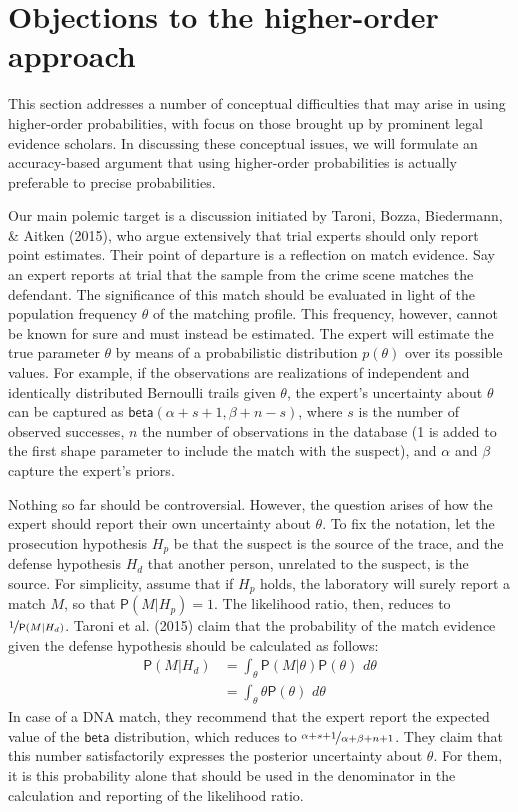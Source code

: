 \documentclass[
  10pt,
  dvipsnames,enabledeprecatedfontcommands]{scrartcl}
\newcommand{\pr}[1]{\mathsf{P}(#1)}
\newcommand{\s}[1]{\mbox{$\mathsf{#1}$}}
\begin{document}
\pagebreak

\hypertarget{objections-to-the-higher-order-approach}{%
\section{Objections to the higher-order
approach}\label{objections-to-the-higher-order-approach}}

This section addresses a number of conceptual difficulties that may
arise in using higher-order probabilities, with focus on those brought
up by prominent legal evidence scholars. In discussing these conceptual
issues, we will formulate an accuracy-based argument that using
higher-order probabilities is actually preferable to precise
probabilities.

Our main polemic target is a discussion initiated by Taroni, Bozza,
Biedermann, \& Aitken (2015), who argue extensively that trial experts
should only report point estimates. Their point of departure is a
reflection on match evidence. Say an expert reports at trial that the
sample from the crime scene matches the defendant. The significance of
this match should be evaluated in light of the population frequency
\(\theta\) of the matching profile. This frequency, however, cannot be
known for sure and must instead be estimated. The expert will estimate
the true parameter \(\theta\) by means of a probabilistic distribution
\(p(\theta)\) over its possible values. For example, if the observations
are realizations of independent and identically distributed Bernoulli
trails given \(\theta\), the expert's uncertainty about \(\theta\) can
be captured as \(\s{beta}(\alpha + s + 1 ,\beta + n - s)\), where \(s\)
is the number of observed successes, \(n\) the number of observations in
the database (1 is added to the first shape parameter to include the
match with the suspect), and \(\alpha\) and \(\beta\) capture the
expert's priors.

Nothing so far should be controversial. However, the question arises of
how the expert should report their own uncertainty about \(\theta\). To
fix the notation, let the prosecution hypothesis \(H_p\) be that the
suspect is the source of the trace, and the defense hypothesis \(H_d\)
that another person, unrelated to the suspect, is the source. For
simplicity, assume that if \(H_p\) holds, the laboratory will surely
report a match \(M\), so that \(\pr{M\vert H_p}=1\). The likelihood
ratio, then, reduces to \(\nicefrac{1}{\pr{M \vert H_d}}\). Taroni et
al. (2015) claim that the probability of the match evidence given the
defense hypothesis should be calculated as follows:
\begin{align*}\pr{M \vert H_d} & = \int_{\theta} \pr{M\vert \theta} \pr{\theta}\,\, d\theta \\
& =  \int_\theta  \theta \pr{\theta}\,\, d\theta
\end{align*} In case of a DNA match, they recommend that the expert
report the expected value of the \(\s{beta}\) distribution, which
reduces to \(\nicefrac{\alpha + s + 1}{\alpha + \beta +n + 1}\). They
claim that this number satisfactorily expresses the posterior
uncertainty about \(\theta\). For them, it is this probability alone
that should be used in the denominator in the calculation and reporting
of the likelihood ratio.
\end{document}
